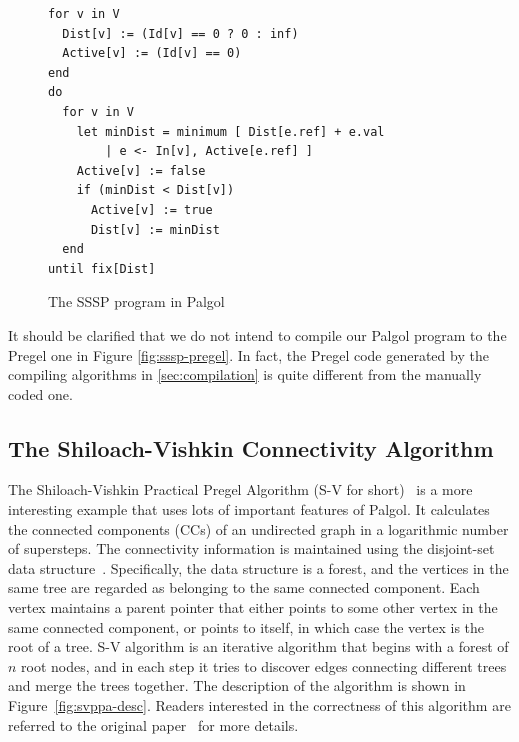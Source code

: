 \documentclass{sokendai_thesis} %
\begin{document}
\begin{figure}[thp]
\begin{lstlisting}[basicstyle=\footnotesize]
for v in V
  Dist[v] := (Id[v] == 0 ? 0 : inf)
  Active[v] := (Id[v] == 0)
end
do
  for v in V
    let minDist = minimum [ Dist[e.ref] + e.val
        | e <- In[v], Active[e.ref] ]
    Active[v] := false
    if (minDist < Dist[v])
      Active[v] := true
      Dist[v] := minDist
  end
until fix[Dist]
\end{lstlisting}
\vspace{-2ex}
\caption{The SSSP program in Palgol}
\label{fig:sssp-palgol}
\end{figure}


It should be clarified that we do not intend to compile our Palgol program to the Pregel one in Figure \ref{fig:sssp-pregel}.
In fact, the Pregel code generated by the compiling algorithms in \autoref{sec:compilation} is quite different from the manually coded one.

\subsection{The Shiloach-Vishkin Connectivity Algorithm}
\label{sec:svppa}

The Shiloach-Vishkin Practical Pregel Algorithm (S-V for short)~\cite{connectivity} is a more interesting example that uses lots of important features of Palgol.
It calculates the connected components (CCs) of an undirected graph in a logarithmic 
number of supersteps.
The connectivity information is maintained using the disjoint-set data structure~\cite{disjointset}.
Specifically, the data structure is a forest, and the vertices in the same tree are regarded as belonging to the same connected component.
Each vertex maintains a parent pointer that either points to some other vertex in the same connected component, or points to itself, in which case the vertex is the root of a tree.
S-V algorithm is an iterative algorithm that begins with a forest of $n$ root nodes, and in each step it tries to discover edges connecting different trees and merge the trees together.
The description of the algorithm is shown in Figure~\ref{fig:svppa-desc}.
Readers interested in the correctness of this algorithm are referred to the original paper~\cite{connectivity} for more details.

\end{document}
